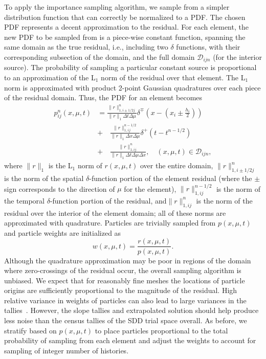 \documentclass{anstrans}
\newcommand{\ds}[0]{\displaystyle}
\begin{document}
To apply the importance sampling algorithm, we sample from a simpler distribution function that can
correctly be normalized to a PDF.  The chosen PDF represents a decent
approximation to the residual.  For each element, the new PDF to be sampled from is a piece-wise constant function, spanning the
same domain as the true residual, i.e., including two $\delta$ functions, with their
corresponding subsection of the domain, and the full domain $\mathcal{D}_{ijn}$ (for the interior
source).  The probability of sampling a particular constant source is proportional
to an approximation of the L$_1$ norm of the residual over that element.  The L$_1$ norm is
approximated with product 2-point Gaussian quadratures over each piece of the residual domain.
Thus, the PDF for an element becomes
\begin{equation}
\begin{array}{cl}
    p_{ij}^n(x,\mu,t) &= \ds \frac{\ds \|r\|_{1,i\pm1/2j}^n}{\ds \|r\|_1\Delta t \Delta \mu}\delta^{\mp}\left(x - (x_{i}
    \pm \frac{\ds h_i}{\ds 2})\right) \\ &+ \quad  \frac{\ds \|r\|_{1,ij}^{n-1/2}}{\ds \|r\|_1\Delta x \Delta
    \mu}\delta^{+}\left(t - t^{n-1/2}\right) \\ &+ \quad  \frac{\ds \|r\|_{1,ij}^n}{\ds \|r\|_1\Delta t \Delta \mu \Delta
    x},\quad  (x,\mu,t) \in \mathcal{D}_{ijn} ,
    \end{array}
\end{equation}
where $\|r\|_1$ is the L$_1$ norm of $r(x,\mu,t)$ over the entire domain,
$\|r\|_{1,i\pm 1/2j}^n$ is the norm of the spatial $\delta$-function portion of the element residual
(where the $\pm$ sign corresponds to the direction of $\mu$ for the element),
$\|r\|_{1,ij}^{n-1/2}$ is
the norm of the temporal $\delta$-function portion of the residual, and$\|r\|_{1,ij}^n$ is the norm
of the residual over the interior of the element domain;
all of these norms are approximated with quadrature. Particles are trivially sampled from $p(x,\mu,t)$ and particle weights are initialized as
\begin{equation}
    w(x,\mu,t) = \frac{r(x,\mu,t)}{p(x,\mu,t)}.
\end{equation}
Although the quadrature
approximation may be poor in regions of the domain where zero-crossings of the residual occur, the
overall sampling algorithm is unbiased.  We expect that for reasonably fine meshes the locations of particle
origins are sufficiently proportional to the magnitude of the residual.  
High relative variance in weights of particles can also lead to large variances in the
tallies~\cite{shultis_mc}.  However, the slope tallies and extrapolated solution should help produce less noise than the census
tallies of the SDD trial space overall.
As before, we stratify based on $p(x,\mu,t)$ to place particles proportional
to the total probability of sampling from each element and adjust the weights to account for
sampling of integer number of histories.
\end{document}
